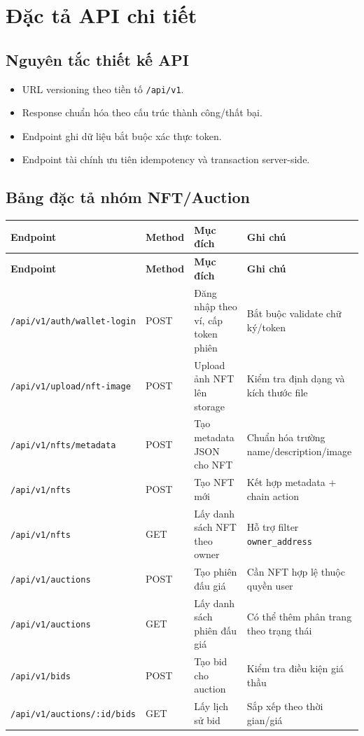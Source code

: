 \documentclass[a4paper,12pt]{report}
\begin{document}
\chapter{Đặc tả API chi tiết}

\section{Nguyên tắc thiết kế API}
\begin{itemize}
    \item URL versioning theo tiền tố \texttt{/api/v1}.
    \item Response chuẩn hóa theo cấu trúc thành công/thất bại.
    \item Endpoint ghi dữ liệu bắt buộc xác thực token.
    \item Endpoint tài chính ưu tiên idempotency và transaction server-side.
\end{itemize}

\section{Bảng đặc tả nhóm NFT/Auction}
\begin{longtable}{|p{3.4cm}|p{2.2cm}|p{4.8cm}|p{4.2cm}|}
\hline
\textbf{Endpoint} & \textbf{Method} & \textbf{Mục đích} & \textbf{Ghi chú} \\
\hline
\endfirsthead
\hline
\textbf{Endpoint} & \textbf{Method} & \textbf{Mục đích} & \textbf{Ghi chú} \\
\hline
\endhead
\texttt{/api/v1/auth/wallet-login} & POST & Đăng nhập theo ví, cấp token phiên & Bắt buộc validate chữ ký/token \\
\hline
\texttt{/api/v1/upload/nft-image} & POST & Upload ảnh NFT lên storage & Kiểm tra định dạng và kích thước file \\
\hline
\texttt{/api/v1/nfts/metadata} & POST & Tạo metadata JSON cho NFT & Chuẩn hóa trường name/description/image \\
\hline
\texttt{/api/v1/nfts} & POST & Tạo NFT mới & Kết hợp metadata + chain action \\
\hline
\texttt{/api/v1/nfts} & GET & Lấy danh sách NFT theo owner & Hỗ trợ filter \texttt{owner\_address} \\
\hline
\texttt{/api/v1/auctions} & POST & Tạo phiên đấu giá & Cần NFT hợp lệ thuộc quyền user \\
\hline
\texttt{/api/v1/auctions} & GET & Lấy danh sách phiên đấu giá & Có thể thêm phân trang theo trạng thái \\
\hline
\texttt{/api/v1/bids} & POST & Tạo bid cho auction & Kiểm tra điều kiện giá thầu \\
\hline
\texttt{/api/v1/auctions/:id/bids} & GET & Lấy lịch sử bid & Sắp xếp theo thời gian/giá \\
\hline
\end{longtable}
\end{document}
